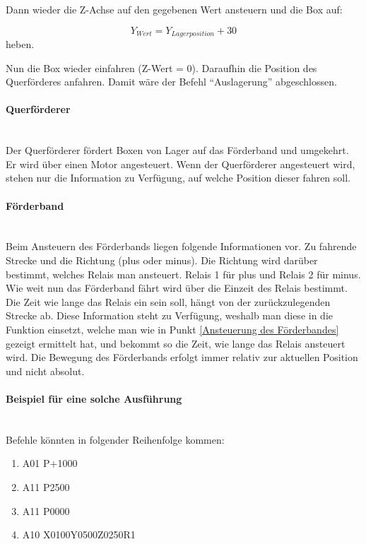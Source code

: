     Dann wieder die Z-Achse auf den gegebenen Wert ansteuern und die Box auf:

    \vspace{-6mm}
    \begin{equation*}
        Y_{Wert} = Y_{Lagerposition} + 30
    \end{equation*}
    heben.

    Nun die Box wieder einfahren (Z-Wert = 0). Daraufhin die Position des Querförderes anfahren. Damit wäre der Befehl ``Auslagerung'' abgeschlossen.


    \paragraph{Querförderer} \mbox{} \\ 
    Der Querförderer fördert Boxen von Lager auf das Förderband und umgekehrt. Er wird über einen Motor angesteuert. Wenn der Querförderer angesteuert wird, stehen nur die Information zu Verfügung, auf welche Position dieser fahren soll. 

    \paragraph{Förderband} \mbox{} \\
    Beim Ansteuern des Förderbands liegen folgende Informationen vor. Zu fahrende Strecke und die Richtung (plus oder minus). Die Richtung wird darüber bestimmt, welches Relais man ansteuert. Relais 1 für plus und Relais 2 für minus. Wie weit nun das Förderband fährt wird über die Einzeit des Relais bestimmt. Die Zeit wie lange das Relais ein sein soll, hängt von der zurückzulegenden Strecke ab. Diese Information steht zu Verfügung, weshalb man diese in die Funktion einsetzt, welche man wie in Punkt \ref{Ansteuerung des Förderbandes} gezeigt ermittelt hat, und bekommt so die Zeit, wie lange das Relais ansteuert wird. Die Bewegung des Förderbands erfolgt immer relativ zur aktuellen Position und nicht absolut. 


    \paragraph{Beispiel für eine solche Ausführung} \mbox{} \\
    Befehle könnten in folgender Reihenfolge kommen:

        \begin{enumerate}
            \item A01 P+1000
            \item A11 P2500
            \item A11 P0000
            \item A10 X0100Y0500Z0250R1
        \end{enumerate}

